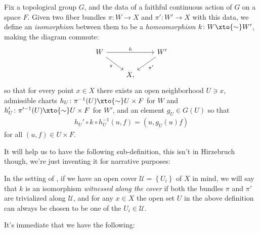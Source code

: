 \documentclass[11pt]{amsart}
\begin{document}
\begin{definition}\label{def:isomorphism-of-fiber-bundles} 
Fix a topological group $G$, and the data of a faithful continuous action of $G$ on a space $F$. Given two fiber bundles $\pi \colon W \to X$ and $\pi' \colon W' \to X$ with this data, we define an \emph{isomorphism} between them to be a \emph{homeomorphism} $k \colon W\xto{\sim} W'$, making the diagram commute:
\[ \begin{tikzcd}
    W\ar[dr,"\pi" below left]\ar[rr,"h" above] &  & W'\ar[dl,"\pi'" below right]\\
     & X, & 
\end{tikzcd} \]
so that for every point $x\in X$ there exists an open neighborhood $U \ni x$, admissible charts $h_U \colon \pi^{-1}(U) \xto{\sim} U \times F$ for $W$ and $h'_U \colon \pi^{\prime-1}(U) \xto{\sim} U \times F$ for $W'$, and an element $g_U \in G(U)$ so that 
\begin{equation}\label{eqn:cohomology-condition-in-iso-of-fiber-bundles}
\begin{aligned}
     h_U' \circ k \circ h_U^{-1}(u,f) = (u,g_U(u)f)
\end{aligned}
\end{equation}
for all $(u,f) \in U \times F$.
\end{definition}

It will help us to have the following sub-definition, this isn't in Hirzebruch though, we're just inventing it for narrative purposes:

\begin{definition} In the setting of , if we have an open cover $\mathcal{U} = \left\{ U_i \right\}$ of $X$ in mind, we will say that $k$ is an isomorphism \emph{witnessed along the cover} if both the bundles $\pi$ and $\pi'$ are trivialized along $\mathcal{U}$, and for any $x\in X$ the open set $U$ in the above definition can always be chosen to be one of the $U_i\in \mathcal{U}$.
\end{definition}

It's immediate that we have the following:
\end{document}
